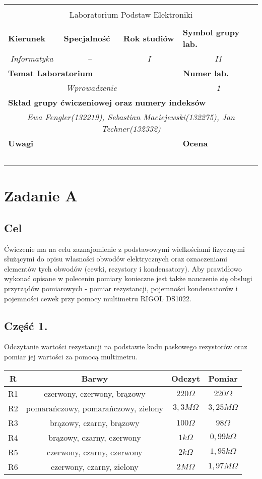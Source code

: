 \documentclass[polish,a4paper]{article}
\newcommand{\PRzFieldDsc}[1]{\sffamily\bfseries\scriptsize #1}
\newcommand{\PRzFieldCnt}[1]{\itshape #1}
\newcommand{\PRzHeading}[8]{

\begin{center}
\begin{tabular}{ p{0.32\textwidth} p{0.15\textwidth} p{0.15\textwidth} p{0.12\textwidth} p{0.12\textwidth} }

  &   &   &   &   \\
\hline
\multicolumn{5}{|c|}{}\\[-1ex]
\multicolumn{5}{|c|}{{\LARGE #1}}\\
\multicolumn{5}{|c|}{}\\[-1ex]

\hline
\multicolumn{1}{|l|}{\PRzFieldDsc{Kierunek}}	& \multicolumn{1}{|l|}{\PRzFieldDsc{Specjalność}}	& \multicolumn{1}{|l|}{\PRzFieldDsc{Rok studiów}}	& \multicolumn{2}{|l|}{\PRzFieldDsc{Symbol grupy lab.}} \\
\multicolumn{1}{|c|}{\PRzFieldCnt{#2}}		& \multicolumn{1}{|c|}{\PRzFieldCnt{#3}}		& \multicolumn{1}{|c|}{\PRzFieldCnt{#4}}		& \multicolumn{2}{|c|}{\PRzFieldCnt{#5}} \\

\hline
\multicolumn{4}{|l|}{\PRzFieldDsc{Temat Laboratorium}}		& \multicolumn{1}{|l|}{\PRzFieldDsc{Numer lab.}} \\
\multicolumn{4}{|c|}{\PRzFieldCnt{#6}}				& \multicolumn{1}{|c|}{\PRzFieldCnt{#7}} \\

\hline
\multicolumn{5}{|l|}{\PRzFieldDsc{Skład grupy ćwiczeniowej oraz numery indeksów}}\\
\multicolumn{5}{|c|}{\PRzFieldCnt{#8}}\\

\hline
\multicolumn{3}{|l|}{\PRzFieldDsc{Uwagi}}	& \multicolumn{2}{|l|}{\PRzFieldDsc{Ocena}} \\
\multicolumn{3}{|c|}{\PRzFieldCnt{\ }}		& \multicolumn{2}{|c|}{\PRzFieldCnt{\ }} \\

\hline
\end{tabular}
\end{center}
}
\begin{document}
\PRzHeading{Laboratorium Podstaw Elektroniki}{Informatyka}{--}{I}{I1}{Wprowadzenie}{1}{Ewa Fengler(132219), Sebastian Maciejewski(132275), Jan Techner(132332)}{}


\section{Zadanie A}

\subsection*{Cel}


Ćwiczenie ma na celu zaznajomienie z podstawowymi wielkościami fizycznymi służącymi do opisu własności obwodów elektrycznych oraz oznaczeniami elementów tych obwodów (cewki, rezystory i kondensatory). Aby prawidłowo wykonać opisane w poleceniu pomiary konieczne jest także nauczenie się obsługi przyrządów pomiarowych - pomiar rezystancji, pojemności kondensatorów i pojemności cewek przy pomocy multimetru RIGOL DS1022.

\subsection{Część 1.}
Odczytanie wartości rezystancji na podstawie kodu paskowego rezystorów oraz pomiar jej wartości za pomocą multimetru.\\

\begin{center}
\begin{tabular}{|c|c|c|c|}
\hline
\textbf{R} & \textbf{Barwy} & \textbf{Odczyt} & \textbf{Pomiar}\\
\hline
R1 & czerwony, czerwony, brązowy & $220\Omega$ & $220\Omega$\\
\hline
R2 & pomarańczowy, pomarańczowy, zielony & $3,3M\Omega$ & $3,25M\Omega$\\
\hline
R3 & brązowy, czarny, brązowy & $100\Omega$ & $98\Omega$\\
\hline
R4 & brązowy, czarny, czerwony & $1k\Omega$ & $0,99k\Omega$\\
\hline
R5 & czerwony, czarny, czerwony & $2k\Omega$ & $1,95k\Omega$\\
\hline
R6 & czerwony, czarny, zielony & $2M\Omega$ & $1,97M\Omega$\\
\hline
\end{tabular}
\end{center}
\end{document}
